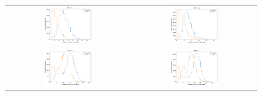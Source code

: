 \documentclass[preprintm,linenumbers]{aastex631}
\begin{document}
  \begin{figure}
			\centering
			\begin{tabular}{c c}
				\includegraphics[width=0.4\textwidth]{results/histograms/hist_first_year_one_snap_v4_0_10yrs_db_noDD_noTwi_CountMetric_doAllTemplateMetrics_reduceCount_u_3_noDD_noTwi.pdf} &
				 \includegraphics[width=0.4\textwidth]{results/histograms/hist_first_year_one_snap_v4_0_10yrs_db_noDD_noTwi_CountMetric_doAllTemplateMetrics_reduceCount_g_3_noDD_noTwi.pdf} \\
				 \includegraphics[width=0.4\textwidth]{results/histograms/hist_first_year_one_snap_v4_0_10yrs_db_noDD_noTwi_CountMetric_doAllTemplateMetrics_reduceCount_r_3_noDD_noTwi.pdf} &
				\includegraphics[width=0.4\textwidth]{results/histograms/hist_first_year_one_snap_v4_0_10yrs_db_noDD_noTwi_CountMetric_doAllTemplateMetrics_reduceCount_i_3_noDD_noTwi.pdf} \\

\end{tabular}
\end{figure}
\end{document}

